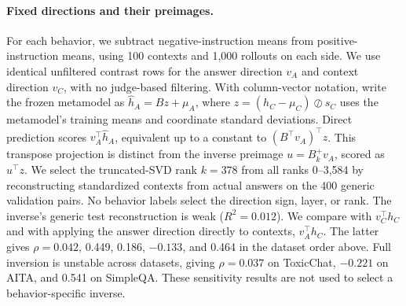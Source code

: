 \paragraph{Fixed directions and their preimages.} For each behavior, we subtract negative-instruction means from positive-instruction means, using 100 contexts and 1,000 rollouts on each side. We use identical unfiltered contrast rows for the answer direction $v_A$ and context direction $v_C$, with no judge-based filtering. With column-vector notation, write the frozen metamodel as $\hat h_A=Bz+\mu_A$, where $z=(h_C-\mu_C)\oslash s_C$ uses the metamodel's training means and coordinate standard deviations. Direct prediction scores $v_A^\top\hat h_A$, equivalent up to a constant to $(B^\top v_A)^\top z$. This transpose projection is distinct from the inverse preimage $u=B_k^+v_A$, scored as $u^\top z$. We select the truncated-SVD rank $k=378$ from all ranks 0--3,584 by reconstructing standardized contexts from actual answers on the 400 generic validation pairs. No behavior labels select the direction sign, layer, or rank. The inverse's generic test reconstruction is weak ($R^2=0.012$). We compare with $v_C^\top h_C$ and with applying the answer direction directly to contexts, $v_A^\top h_C$. The latter gives $\rho=0.042$, 0.449, 0.186, $-0.133$, and 0.464 in the dataset order above. Full inversion is unstable across datasets, giving $\rho=0.037$ on ToxicChat, $-0.221$ on AITA, and 0.541 on SimpleQA. These sensitivity results are not used to select a behavior-specific inverse.

